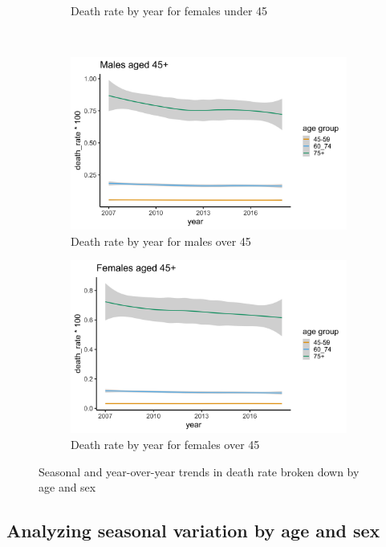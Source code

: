 \documentclass[11pt]{article}
\begin{document}
\begin{figure}
\begin{subfigure}[t]{0.49\textwidth}
\caption{Death rate by year for females under 45}
\label{fig:young_women_year}
\end{subfigure}
\\
\begin{subfigure}[t]{0.49\textwidth}
\centering
\includegraphics[scale=0.076]{figs/old_men_year.png}
\caption{Death rate by year for males over 45}
\label{fig:old_men_year}
\end{subfigure}
\begin{subfigure}[t]{0.49\textwidth}
\centering
\includegraphics[scale=0.076]{figs/old_women_year.png}
\caption{Death rate by year for females over 45}
\label{fig:old_women_year}
\end{subfigure}
\caption{Seasonal and year-over-year trends in death rate broken down by age and sex}
\label{fig:trends}
\end{figure}


\subsection{Analyzing seasonal variation by age and sex}\label{sec:age_sex}
\end{document}

